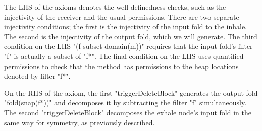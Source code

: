 \documentclass[msc,oneside]{ubcthesis}
\theoremstyle{definition}
\begin{document}
The LHS of the axioms denotes the well-definedness checks, such as the injectivity of the receiver and the usual permissions. There are two separate injectivity conditions; the first is the injectivity of the input fold to the inhale. The second is the injectivity of the output fold, which we will generate. The third condition on the LHS "(f subset domain(m))" requires that the input fold's filter "f" is actually a subset of "f*". The final condition on the LHS uses quantified permissions to check that the method has permissions to the heap locations denoted by filter "f*".

On the RHS of the axiom, the first "triggerDeleteBlock" generates the output fold "fold(snap(f*))" and decomposes it by subtracting the filter "f" simultaneously. The second "triggerDeleteBlock" decomposes the exhale node's input fold in the same way for symmetry, as previously described.





\end{document}
